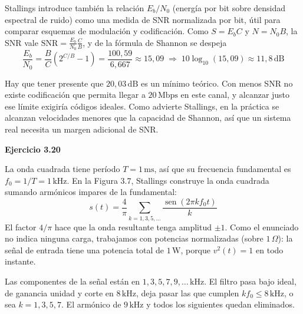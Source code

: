 \documentclass[11pt,a4paper]{article}
\newcommand{\sen}{\operatorname{sen}}
\begin{document}
Stallings introduce también la relación $E_b/N_0$ (energía por bit sobre densidad espectral de ruido) como una medida de SNR normalizada por bit, útil para comparar esquemas de modulación y codificación. Como $S=E_bC$ y $N=N_0B$, la SNR vale $\mathrm{SNR}=\frac{E_b}{N_0}\frac{C}{B}$, y de la fórmula de Shannon se despeja
\[
  \frac{E_b}{N_0}=\frac{B}{C}\left(2^{C/B}-1\right)=\frac{100{,}59}{6{,}667}\approx15{,}09
  \;\Rightarrow\;10\log_{10}(15{,}09)\approx11{,}8\,\mathrm{dB}
\]

Hay que tener presente que $20{,}03\,\mathrm{dB}$ es un mínimo teórico. Con menos SNR no existe codificación que permita llegar a $20\,\mathrm{Mbps}$ en este canal, y alcanzar justo ese límite exigiría códigos ideales. Como advierte Stallings, en la práctica se alcanzan velocidades menores que la capacidad de Shannon, así que un sistema real necesita un margen adicional de SNR.

\vspace{0.3cm}
\noindent\textbf{Ejercicio 3.20}\par
La onda cuadrada tiene período $T=1\,\mathrm{ms}$, así que su frecuencia fundamental es $f_0=1/T=1\,\mathrm{kHz}$. En la Figura 3.7, Stallings construye la onda cuadrada sumando armónicos impares de la fundamental:
\[
  s(t)=\frac{4}{\pi}\sum_{k=1,3,5,\dots}\frac{\sen(2\pi k f_0 t)}{k}
\]
El factor $4/\pi$ hace que la onda resultante tenga amplitud $\pm1$. Como el enunciado no indica ninguna carga, trabajamos con potencias normalizadas (sobre $1\,\Omega$): la señal de entrada tiene una potencia total de $1\,\mathrm{W}$, porque $v^2(t)=1$ en todo instante.

Las componentes de la señal están en $1,3,5,7,9,\dots\,\mathrm{kHz}$. El filtro pasa bajo ideal, de ganancia unidad y corte en $8\,\mathrm{kHz}$, deja pasar las que cumplen $kf_0\le8\,\mathrm{kHz}$, o sea $k=1,3,5,7$. El armónico de $9\,\mathrm{kHz}$ y todos los siguientes quedan eliminados.
\end{document}

